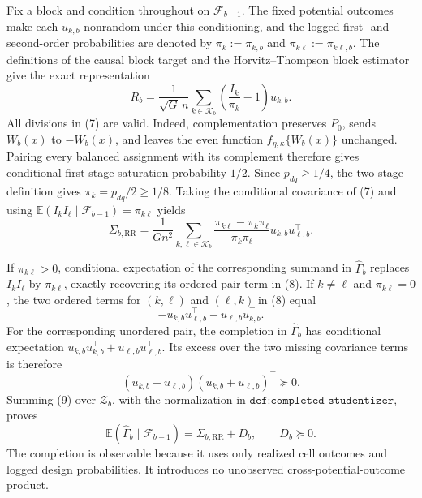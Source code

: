 Fix a block and condition throughout on \(\mathcal F_{b-1}\).  The fixed potential outcomes make each \(u_{k,b}\) nonrandom under this conditioning, and the logged first- and second-order probabilities are denoted by \(\pi_k:=\pi_{k,b}\) and \(\pi_{k\ell}:=\pi_{k\ell,b}\).  The definitions of the causal block target and the Horvitz--Thompson block estimator give the exact representation
\[
 R_b=\frac1{\sqrt G\,n}\sum_{k\in\mathcal K_b}
       \left(\frac{I_k}{\pi_k}-1\right)u_{k,b}.             \tag{7}
\]
All divisions in (7) are valid.  Indeed, complementation preserves \(P_0\), sends \(W_b(x)\) to \(-W_b(x)\), and leaves the even function \(f_{\eta,\kappa}\{W_b(x)\}\) unchanged.  Pairing every balanced assignment with its complement therefore gives conditional first-stage saturation probability \(1/2\).  Since \(p_{dq}\ge1/4\), the two-stage definition gives \(\pi_k=p_{dq}/2\ge1/8\).  Taking the conditional covariance of (7) and using
\(\mathbb E(I_kI_\ell\mid\mathcal F_{b-1})=\pi_{k\ell}\) yields
\[
 \Sigma_{b,\mathrm{RR}}
 =\frac1{Gn^2}\sum_{k,\ell\in\mathcal K_b}
   \frac{\pi_{k\ell}-\pi_k\pi_\ell}{\pi_k\pi_\ell}
   u_{k,b}u_{\ell,b}^\top.                                 \tag{8}
\]

If \(\pi_{k\ell}>0\), conditional expectation of the corresponding summand in \(\widehat\Gamma_b\) replaces \(I_kI_\ell\) by \(\pi_{k\ell}\), exactly recovering its ordered-pair term in (8).  If \(k\ne\ell\) and \(\pi_{k\ell}=0\), the two ordered terms for \((k,\ell)\) and \((\ell,k)\) in (8) equal
\[
 -u_{k,b}u_{\ell,b}^\top-u_{\ell,b}u_{k,b}^\top.
\]
For the corresponding unordered pair, the completion in \(\widehat\Gamma_b\) has conditional expectation
\(u_{k,b}u_{k,b}^\top+u_{\ell,b}u_{\ell,b}^\top\).  Its excess over the two missing covariance terms is therefore
\[
 (u_{k,b}+u_{\ell,b})(u_{k,b}+u_{\ell,b})^\top\succeq0.   \tag{9}
\]
Summing (9) over \(\mathcal Z_b\), with the normalization in \(\texttt{def:completed-studentizer}\), proves
\[
 \mathbb E(\widehat\Gamma_b\mid\mathcal F_{b-1})
 =\Sigma_{b,\mathrm{RR}}+D_b,
 \qquad D_b\succeq0.                                      \tag{10}
\]
The completion is observable because it uses only realized cell outcomes and logged design probabilities.  It introduces no unobserved cross-potential-outcome product.

